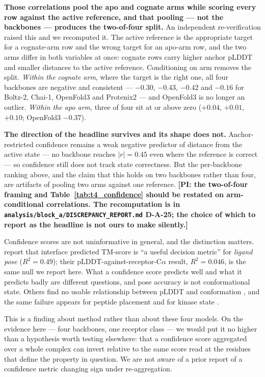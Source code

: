 \textbf{Those correlations pool the apo and cognate arms while scoring every row
against the active reference, and that pooling --- not the backbones ---
produces the two-of-four split.} An independent re-verification raised this and
we recomputed it. The active reference is the appropriate target for a
cognate-arm row and the wrong target for an apo-arm row, and the two arms differ
in both variables at once: cognate rows carry higher anchor pLDDT and smaller
distances to the active reference. Conditioning on arm removes the split.
\emph{Within the cognate arm}, where the target is the right one, all four
backbones are negative and consistent --- $-0.30$, $-0.43$, $-0.42$ and $-0.16$
for Boltz-2, Chai-1, OpenFold3 and Protenix2 --- and OpenFold3 is no longer an
outlier. \emph{Within the apo arm}, three of four sit at or above zero
($+0.04$, $+0.01$, $+0.10$; OpenFold3 $-0.37$).

\textbf{The direction of the headline survives and its shape does not.}
Anchor-restricted confidence remains a weak negative predictor of distance from
the active state --- no backbone reaches $|r| = 0.45$ even where the reference is
correct --- so confidence still does not track state correctness. But the
per-backbone ranking above, and the claim that this holds on two backbones
rather than four, are artifacts of pooling two arms against one reference.
\textbf{[PI: the two-of-four framing and Table~\ref{tab:t4_confidence} should be restated on
arm-conditional correlations. The recomputation is in
\texttt{analysis/block\_a/DISCREPANCY\_REPORT.md} D-A-25; the choice of which
to report as the headline is not ours to make silently.]}

Confidence scores are not uninformative in general, and the distinction matters.
\citet{zhang2026generalization} report that interface predicted TM-score is ``a
useful decision metric'' for \emph{ligand pose} ($R^2 = 0.49$); their
pLDDT-against-receptor-C$\alpha$ result, $R^2 = 0.046$, is the same null we
report here. What a confidence score predicts well and what it predicts badly
are different questions, and pose accuracy is not conformational state. Others
find no usable relationship between pLDDT and conformation
\citep[p.~5]{bryant2024cfold}, and the same failure appears for peptide
placement \citep{junker2026peptidedesign} and for kinase state
\citep{sun2026kinconfbench}.

This is a finding about method rather than about these four models. On the
evidence here --- four backbones, one receptor class --- we would put it no
higher than a hypothesis worth testing elsewhere: that a confidence score
aggregated over a whole complex can invert relative to the same score read at
the residues that define the property in question. We are not aware of a prior
report of a confidence metric changing sign under re-aggregation.

